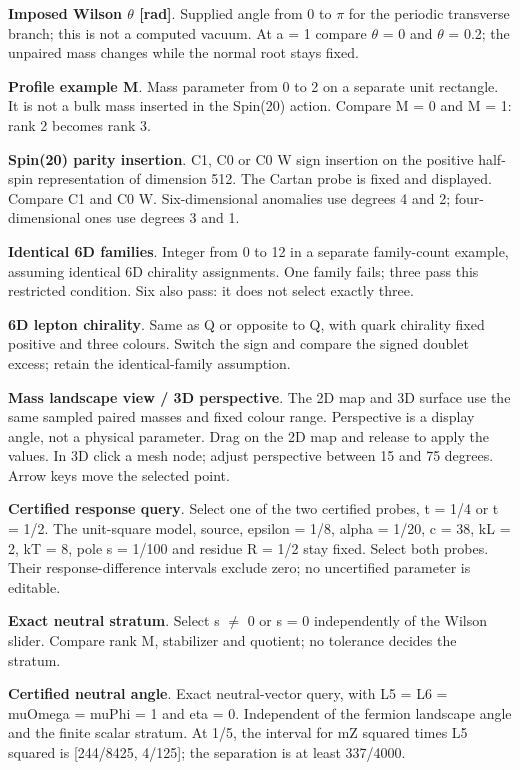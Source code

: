 \documentclass[11pt,a4paper]{article}
\begin{document}
\textbf{Imposed Wilson \ensuremath{\theta} [rad]}. Supplied angle from 0 to \ensuremath{\pi} for the periodic transverse branch; this is not a computed vacuum. At a = 1 compare \ensuremath{\theta} = 0 and \ensuremath{\theta} = 0.2; the unpaired mass changes while the normal root stays fixed.

\textbf{Profile example M}. Mass parameter from 0 to 2 on a separate unit rectangle. It is not a bulk mass inserted in the Spin(20) action. Compare M = 0 and M = 1: rank 2 becomes rank 3.

\textbf{Spin(20) parity insertion}. C1, C0 or C0 W sign insertion on the positive half-spin representation of dimension 512. The Cartan probe is fixed and displayed. Compare C1 and C0 W. Six-dimensional anomalies use degrees 4 and 2; four-dimensional ones use degrees 3 and 1.

\textbf{Identical 6D families}. Integer from 0 to 12 in a separate family-count example, assuming identical 6D chirality assignments. One family fails; three pass this restricted condition. Six also pass: it does not select exactly three.

\textbf{6D lepton chirality}. Same as Q or opposite to Q, with quark chirality fixed positive and three colours. Switch the sign and compare the signed doublet excess; retain the identical-family assumption.

\textbf{Mass landscape view / 3D perspective}. The 2D map and 3D surface use the same sampled paired masses and fixed colour range. Perspective is a display angle, not a physical parameter. Drag on the 2D map and release to apply the values. In 3D click a mesh node; adjust perspective between 15 and 75 degrees. Arrow keys move the selected point.

\textbf{Certified response query}. Select one of the two certified probes, t = 1/4 or t = 1/2. The unit-square model, source, epsilon = 1/8, alpha = 1/20, c = 38, kL = 2, kT = 8, pole s = 1/100 and residue R = 1/2 stay fixed. Select both probes. Their response-difference intervals exclude zero; no uncertified parameter is editable.

\textbf{Exact neutral stratum}. Select s \ensuremath{\neq} 0 or s = 0 independently of the Wilson slider. Compare rank M, stabilizer and quotient; no tolerance decides the stratum.

\textbf{Certified neutral angle}. Exact neutral-vector query, with L5 = L6 = muOmega = muPhi = 1 and eta = 0. Independent of the fermion landscape angle and the finite scalar stratum. At 1/5, the interval for mZ squared times L5 squared is [244/8425, 4/125]; the separation is at least 337/4000.
\end{document}
